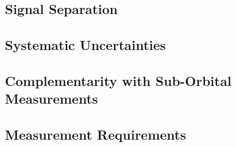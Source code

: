 \documentclass[12pt]{article}
\begin{document}
\subsection{Signal Separation}%
\label{sec:signal_separation}




\subsection{Systematic Uncertainties}%
\label{sec:systematics}



\subsection{Complementarity with Sub-Orbital Measurements}
\label{sec:complementarity}




\subsection{Measurement Requirements} %
\label{sec:requirements}






%



%



%



%

 

\newpage
\def\bibfont{\footnotesize}
\setlength{\bibsep}{1pt}




\end{document}
